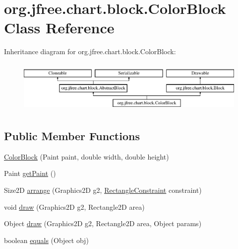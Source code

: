 \hypertarget{classorg_1_1jfree_1_1chart_1_1block_1_1_color_block}{}\section{org.\+jfree.\+chart.\+block.\+Color\+Block Class Reference}
\label{classorg_1_1jfree_1_1chart_1_1block_1_1_color_block}
Inheritance diagram for org.\+jfree.\+chart.\+block.\+Color\+Block\+:\begin{figure}[H]
\begin{center}
\leavevmode
\includegraphics[height=2.568807cm]{classorg_1_1jfree_1_1chart_1_1block_1_1_color_block}
\end{center}
\end{figure}
\subsection*{Public Member Functions}
\begin{DoxyCompactItemize}
\item 
\mbox{\hyperlink{classorg_1_1jfree_1_1chart_1_1block_1_1_color_block_afb0a738051d46f1507508d1776da8d01}{Color\+Block}} (Paint paint, double width, double height)
\item 
Paint \mbox{\hyperlink{classorg_1_1jfree_1_1chart_1_1block_1_1_color_block_a2c63daa0556f70bbbeaf9d6de274257b}{get\+Paint}} ()
\item 
Size2D \mbox{\hyperlink{classorg_1_1jfree_1_1chart_1_1block_1_1_color_block_a0fc4c45fb677dc2f062fae9f5d4656e0}{arrange}} (Graphics2D g2, \mbox{\hyperlink{classorg_1_1jfree_1_1chart_1_1block_1_1_rectangle_constraint}{Rectangle\+Constraint}} constraint)
\item 
void \mbox{\hyperlink{classorg_1_1jfree_1_1chart_1_1block_1_1_color_block_a6ec243ee9e68115d14be1cd98d75be25}{draw}} (Graphics2D g2, Rectangle2D area)
\item 
Object \mbox{\hyperlink{classorg_1_1jfree_1_1chart_1_1block_1_1_color_block_a7f085b5efe2aeb2fb4d71211be85ee59}{draw}} (Graphics2D g2, Rectangle2D area, Object params)
\item 
boolean \mbox{\hyperlink{classorg_1_1jfree_1_1chart_1_1block_1_1_color_block_a34813e8ffeaae50cf832205d0223c833}{equals}} (Object obj)
\end{DoxyCompactItemize}
